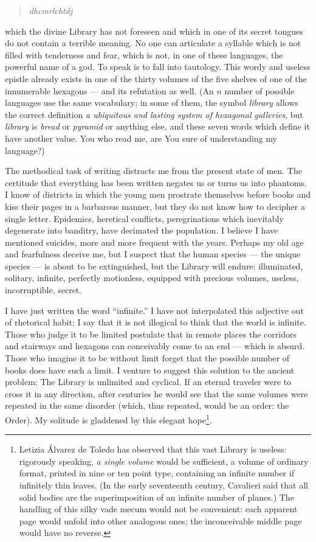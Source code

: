 \documentclass[oneside]{book}
\begin{document}
\begin{quote}\itshape
    dhcmrlchtdj
\end{quote}

which the divine Library has not foreseen and which in one of its secret tongues do not contain a terrible meaning. No one can articulate a syllable which is not filled with tenderness and fear, which is not, in one of these languages, the powerful name of a god. To speak is to fall into tautology. This wordy and useless epistle already exists in one of the thirty volumes of the five shelves of one of the innumerable hexagons --- and its refutation as well. (An $n$ number of possible languages use the same vocabulary; in some of them, the symbol \textit{library} allows the correct definition \textit{a ubiquitous and lasting system of hexagonal galleries}, but \textit{library} is \textit{bread} or \textit{pyramid} or anything else, and these seven words which define it have another value. You who read me, are You sure of understanding my language?)

The methodical task of writing distracts me from the present state of men. The certitude that everything has been written negates us or turns us into phantoms. I know of districts in which the young men prostrate themselves before books and kiss their pages in a barbarous manner, but they do not know how to decipher a single letter. Epidemics, heretical conflicts, peregrinations which inevitably degenerate into banditry, have decimated the population. I believe I have mentioned suicides, more and more frequent with the years. Perhaps my old age and fearfulness deceive me, but I suspect that the human species --- the unique species --- is about to be extinguished, but the Library will endure: illuminated, solitary, infinite, perfectly motionless, equipped with precious volumes, useless, incorruptible, secret.

I have just written the word ``infinite.'' I have not interpolated this adjective out of rhetorical habit; I say that it is not illogical to think that the world is infinite. Those who judge it to be limited postulate that in remote places the corridors and stairways and hexagons can conceivably come to an end --- which is absurd. Those who imagine it to be without limit forget that the possible number of books does have such a limit. I venture to suggest this solution to the ancient problem:  The Library is unlimited and cyclical. If an eternal traveler were to cross it in any direction, after centuries he would see that the same volumes were repeated in the same disorder (which, thus repeated, would be an order: the Order). My solitude is gladdened by this elegant hope\footnote{Letizia Álvarez de Toledo has observed that this vast Library is useless: rigorously speaking, \emph{a single volume} would be sufficient, a volume of ordinary format, printed in nine or ten point type, containing an infinite number if infinitely thin leaves. (In the early seventeenth century, Cavalieri said that all solid bodies are the superimposition of an infinite number of planes.) The handling of this silky vade mecum would not be convenient: each apparent page would unfold into other analogous ones; the inconceivable middle page would have no reverse.}.
\end{document}
